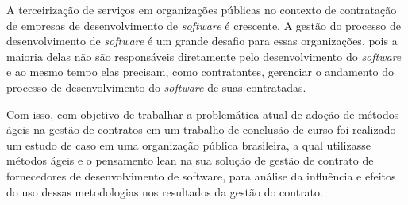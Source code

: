 A terceirização de serviços em organizações públicas no contexto de contratação de empresas de desenvolvimento de \textit{software} é crescente. A gestão do processo de desenvolvimento de \textit{software} é um grande desafio para essas organizações, pois a maioria delas não são responsáveis diretamente pelo desenvolvimento do \textit{software} e ao mesmo tempo elas precisam, como contratantes, gerenciar o andamento do processo de desenvolvimento do \textit{software} de suas contratadas. 

Com isso, com objetivo de trabalhar a problemática atual de adoção de métodos ágeis na gestão de contratos em um trabalho de conclusão de curso foi realizado um estudo de caso em uma organização pública brasileira, a qual utilizasse métodos ágeis e o  pensamento lean na sua solução de gestão de contrato de fornecedores de desenvolvimento de software, para análise da influência e efeitos do uso dessas metodologias nos resultados da gestão do contrato.
